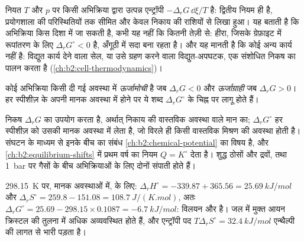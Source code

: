 \begin{remark}[निकष क्या कहता है, और क्या नहीं]\label{rem:b2:reaction-free-energy:criterion}
नियत $T$ और $p$ पर किसी अभिक्रिया द्वारा उत्पन्न एन्ट्रॉपी $-\Delta_r G\,
\dd\xi/T$ है:  द्वितीय नियम ही है, प्रयोगशाला की परिस्थितियों तक
सीमित और केवल निकाय की राशियों से लिखा हुआ। यह बताती है
कि अभिक्रिया किस दिशा में जा सकती है, कभी यह नहीं कि कितनी तेज़ी से: हीरा, जिसके
ग्रेफ़ाइट में रूपांतरण के लिए $\Delta_r G^\circ < 0$ है, अँगूठी में सदा
बना रहता है। और यह मानती है कि कोई अन्य कार्य नहीं है: विद्युत कार्य देने वाला
सेल, या उसे ग्रहण करने वाला विद्युत-अपघटक, एक संशोधित निकष का पालन करता है
(\cref{ch:b2:cell-thermodynamics})।
\end{remark}

\begin{definition}[ऊर्जामोची और ऊर्जाग्राही]\label{def:b2:reaction-free-energy:exergonic}
कोई अभिक्रिया किसी दी गई अवस्था में \emph{ऊर्जामोची} है जब
$\Delta_r G < 0$ और \emph{ऊर्जाग्राही} जब $\Delta_r G >
0$। हर स्पीशीज़ के अपनी मानक अवस्था में होने पर ये शब्द
$\Delta_r G^\circ$ के चिह्न पर लागू होते हैं।
\end{definition}

निकष $\Delta_r G$ का उपयोग करता है, अर्थात् निकाय की वास्तविक अवस्था वाले
मान का; $\Delta_r G^\circ$ हर स्पीशीज़ को उसकी मानक अवस्था में लेता है,
जो विरले ही किसी वास्तविक मिश्रण की अवस्था होती है। संघटन के माध्यम से
इनके बीच का संबंध \cref{ch:b2:chemical-potential} का विषय है, और
\cref{ch:b2:equilibrium-shifts} में प्रथम वर्ष का नियम $Q = K^\circ$ देता है।
शुद्ध ठोसों और द्रवों, तथा \qty{1}{bar} पर गैसों के बीच अभिक्रियाओं के लिए
दोनों संपाती होते हैं।

\begin{example}[ठंडा पैक]\label{ex:b2:reaction-free-energy:cold-pack}
\qty{298.15}{K} पर, मानक अवस्थाओं में,  के लिए:
$\Delta_r H^\circ = -339.87 + 365.56 = \qty{+25.69}{kJ/mol}$ और
$\Delta_r S^\circ = 259.8 - 151.08 = \qty{+108.7}{J/(K.mol)}$, अतः
$\Delta_r G^\circ = 25.69 - 298.15 \times 0.1087 = \qty{-6.7}{kJ/mol}$:
विलयन  और  है। जल में मुक्त आयन क्रिस्टल की
तुलना में अधिक अव्यवस्थित होते हैं, और एन्ट्रॉपी पद $T\Delta_r
S^\circ = \qty{32.4}{kJ/mol}$ एन्थैल्पी की लागत से भारी पड़ता है।
\end{example}

